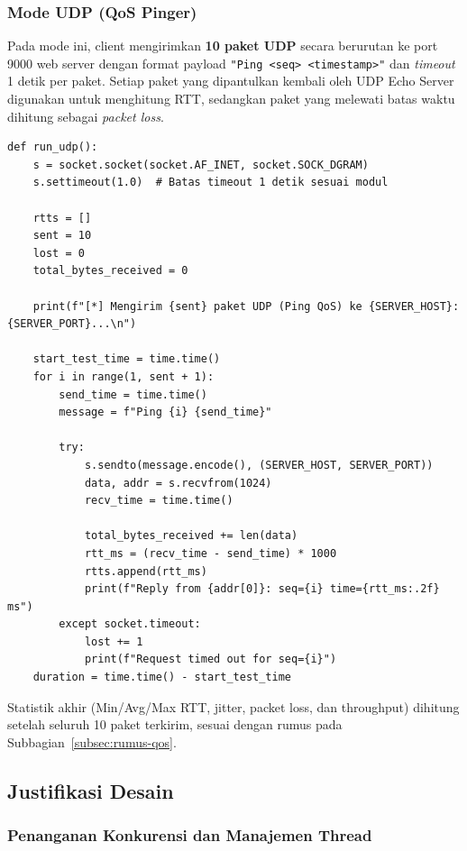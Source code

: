 \documentclass[11pt,a4paper]{article}
\begin{document}
\subsubsection{Mode UDP (QoS Pinger)}

Pada mode ini, client mengirimkan \textbf{10 paket UDP} secara berurutan ke port 9000 web server dengan format payload \texttt{"Ping <seq> <timestamp>"} dan \textit{timeout} 1 detik per paket. Setiap paket yang dipantulkan kembali oleh UDP Echo Server digunakan untuk menghitung RTT, sedangkan paket yang melewati batas waktu dihitung sebagai \textit{packet loss}.

\begin{lstlisting}[caption={Mode UDP / QoS Pinger pada \texttt{client.py}}, label={lst:client-udp}]
def run_udp():
    s = socket.socket(socket.AF_INET, socket.SOCK_DGRAM)
    s.settimeout(1.0)  # Batas timeout 1 detik sesuai modul

    rtts = []
    sent = 10
    lost = 0
    total_bytes_received = 0

    print(f"[*] Mengirim {sent} paket UDP (Ping QoS) ke {SERVER_HOST}:{SERVER_PORT}...\n")

    start_test_time = time.time()
    for i in range(1, sent + 1):
        send_time = time.time()
        message = f"Ping {i} {send_time}"

        try:
            s.sendto(message.encode(), (SERVER_HOST, SERVER_PORT))
            data, addr = s.recvfrom(1024)
            recv_time = time.time()

            total_bytes_received += len(data)
            rtt_ms = (recv_time - send_time) * 1000
            rtts.append(rtt_ms)
            print(f"Reply from {addr[0]}: seq={i} time={rtt_ms:.2f} ms")
        except socket.timeout:
            lost += 1
            print(f"Request timed out for seq={i}")
    duration = time.time() - start_test_time
\end{lstlisting}

Statistik akhir (Min/Avg/Max RTT, jitter, packet loss, dan throughput) dihitung setelah seluruh 10 paket terkirim, sesuai dengan rumus pada Subbagian~\ref{subsec:rumus-qos}.

\subsection{Justifikasi Desain}

\subsubsection{Penanganan Konkurensi dan Manajemen Thread}
\end{document}
